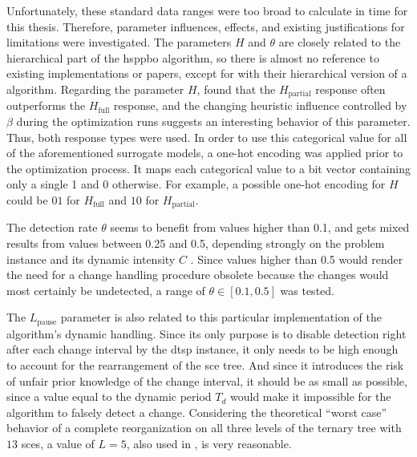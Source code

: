 Unfortunately, these standard data ranges were too broad to calculate in time for this thesis. Therefore, parameter influences, effects, and existing justifications for limitations were investigated.
The parameters $H$ and $\theta$ are closely related to the hierarchical part of the \gls{hsppbo} algorithm, so there is almost no reference to existing implementations or papers, except for \citet{janson2006hierarchical} with their hierarchical version of a  algorithm. Regarding the parameter $H$, \citet{kupfer2021hierarchical} found that the $H_{\text{partial}}$ response often outperforms the $H_{\text{full}}$ response, and the changing heuristic influence controlled by $\beta$ during the optimization runs suggests an interesting behavior of this parameter. Thus, both response types were used. In order to use this categorical value for all of the aforementioned surrogate models, a one-hot encoding was applied prior to the optimization process. It maps each categorical value to a bit vector containing only a single 1 and 0 otherwise. For example, a possible one-hot encoding for $H$ could be $01$ for $H_{\text{full}}$ and $10$ for $H_{\text{partial}}$.

The detection rate $\theta$ seems to benefit from values higher than 0.1, and gets mixed results from values between 0.25 and 0.5, depending strongly on the problem instance and its dynamic intensity $C$ \cite{kupfer2021hierarchical}. Since values higher than 0.5 would render the need for a change handling procedure obsolete because the changes would most certainly be undetected, a range of $\theta \in [0.1, 0.5]$ was tested. 

The $L_\text{pause}$ parameter is also related to this particular implementation of the algorithm's dynamic handling. Since its only purpose is to disable detection right after each change interval by the \gls{dtsp} instance, it only needs to be high enough to account for the rearrangement of the \gls{sce} tree. And since it introduces the risk of unfair prior knowledge of the change interval, it should be as small as possible, since a value equal to the dynamic period $T_{d}$ would make it impossible for the algorithm to falsely detect a change. Considering the theoretical \enquote{worst case} behavior of a complete reorganization on all three levels of the ternary tree with $13$ \glspl{sce}, a value of $L = 5$, also used in \cite{kupfer2021hierarchical}, is very reasonable.

